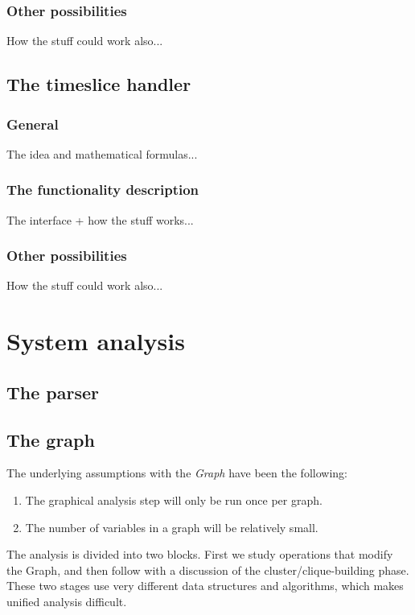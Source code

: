 \documentclass[12pt,a4paper]{report}
\newcommand{\cdatatype}[1]{{\it #1}}
\begin{document}
\subsection{Other possibilities}

How the stuff could work also...


\newpage
\section{The timeslice handler} %
\subsection{General}

The idea and mathematical formulas...

\subsection{The functionality description}

The interface + how the stuff works...

\subsection{Other possibilities}

How the stuff could work also...



\newpage
\chapter{System analysis}
\section{The parser}

\section{The graph}
The underlying assumptions with the \cdatatype{Graph} have been the following:
\begin{enumerate}
\item The graphical analysis step will only be run once per graph.
\item The number of variables in a graph will be relatively small.
\end{enumerate}

The analysis is divided into two blocks. First we study operations
that modify the Graph, and then follow with a discussion of the
cluster/clique-building phase. These two stages use very different
data structures and algorithms, which makes unified analysis
difficult.
\end{document}
